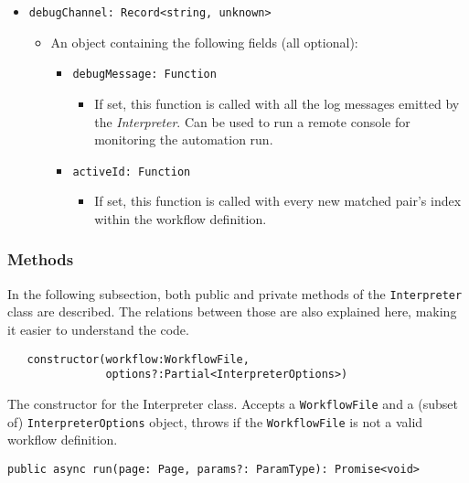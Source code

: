 \begin{itemize}
\begin{itemize}
   \end{itemize}
   \item \texttt{debugChannel: Record<string, unknown>}
   \begin{itemize}
      \item An object containing the following fields (all optional):
      \begin{itemize}
         \item \texttt{debugMessage: Function}
         \begin{itemize}
            \item If set, this function is called with all the log messages emitted by the \textit{Interpreter}.
            Can be used to run a remote console for monitoring the automation run.
         \end{itemize}
         \item \texttt{activeId: Function}
         \begin{itemize}
            \item If set, this function is called with every new matched pair's index within the workflow definition.
         \end{itemize}
      \end{itemize}
   \end{itemize}
\end{itemize}



\subsubsection{Methods}

In the following subsection, both public and private methods of the \texttt{Interpreter} class are described.
The relations between those are also explained here, making it easier to understand the code.

\emptyline
\begin{verbatim}
   constructor(workflow:WorkflowFile, 
               options?:Partial<InterpreterOptions>)
\end{verbatim}

The constructor for the Interpreter class.
Accepts a \texttt{WorkflowFile} and a (subset of) \texttt{InterpreterOptions} object,
throws if the \texttt{WorkflowFile} is not a valid workflow definition.

\smallskip

\emptyline
\verb|public async run(page: Page, params?: ParamType): Promise<void>|

